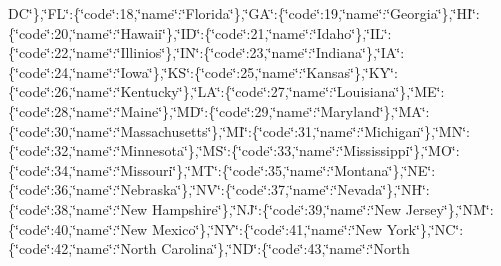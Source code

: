 {D\-C\char`\"{}\},\char`\"{}F\-L\char`\"{}\-:\{\char`\"{}code\char`\"{}\-:18,\char`\"{}name\char`\"{}\-:\char`\"{}Florida\char`\"{}\},\char`\"{}G\-A\char`\"{}\-:\{\char`\"{}code\char`\"{}\-:19,\char`\"{}name\char`\"{}\-:\char`\"{}Georgia\char`\"{}\},\char`\"{}H\-I\char`\"{}\-:\{\char`\"{}code\char`\"{}\-:20,\char`\"{}name\char`\"{}\-:\char`\"{}Hawaii\char`\"{}\},\char`\"{}I\-D\char`\"{}\-:\{\char`\"{}code\char`\"{}\-:21,\char`\"{}name\char`\"{}\-:\char`\"{}Idaho\char`\"{}\},\char`\"{}I\-L\char`\"{}\-:\{\char`\"{}code\char`\"{}\-:22,\char`\"{}name\char`\"{}\-:\char`\"{}Illinios\char`\"{}\},\char`\"{}I\-N\char`\"{}\-:\{\char`\"{}code\char`\"{}\-:23,\char`\"{}name\char`\"{}\-:\char`\"{}Indiana\char`\"{}\},\char`\"{}I\-A\char`\"{}\-:\{\char`\"{}code\char`\"{}\-:24,\char`\"{}name\char`\"{}\-:\char`\"{}Iowa\char`\"{}\},\char`\"{}K\-S\char`\"{}\-:\{\char`\"{}code\char`\"{}\-:25,\char`\"{}name\char`\"{}\-:\char`\"{}Kansas\char`\"{}\},\char`\"{}K\-Y\char`\"{}\-:\{\char`\"{}code\char`\"{}\-:26,\char`\"{}name\char`\"{}\-:\char`\"{}Kentucky\char`\"{}\},\char`\"{}L\-A\char`\"{}\-:\{\char`\"{}code\char`\"{}\-:27,\char`\"{}name\char`\"{}\-:\char`\"{}Louisiana\char`\"{}\},\char`\"{}M\-E\char`\"{}\-:\{\char`\"{}code\char`\"{}\-:28,\char`\"{}name\char`\"{}\-:\char`\"{}Maine\char`\"{}\},\char`\"{}M\-D\char`\"{}\-:\{\char`\"{}code\char`\"{}\-:29,\char`\"{}name\char`\"{}\-:\char`\"{}Maryland\char`\"{}\},\char`\"{}M\-A\char`\"{}\-:\{\char`\"{}code\char`\"{}\-:30,\char`\"{}name\char`\"{}\-:\char`\"{}Massachusetts\char`\"{}\},\char`\"{}M\-I\char`\"{}\-:\{\char`\"{}code\char`\"{}\-:31,\char`\"{}name\char`\"{}\-:\char`\"{}Michigan\char`\"{}\},\char`\"{}M\-N\char`\"{}\-:\{\char`\"{}code\char`\"{}\-:32,\char`\"{}name\char`\"{}\-:\char`\"{}Minnesota\char`\"{}\},\char`\"{}M\-S\char`\"{}\-:\{\char`\"{}code\char`\"{}\-:33,\char`\"{}name\char`\"{}\-:\char`\"{}Mississippi\char`\"{}\},\char`\"{}M\-O\char`\"{}\-:\{\char`\"{}code\char`\"{}\-:34,\char`\"{}name\char`\"{}\-:\char`\"{}Missouri\char`\"{}\},\char`\"{}M\-T\char`\"{}\-:\{\char`\"{}code\char`\"{}\-:35,\char`\"{}name\char`\"{}\-:\char`\"{}Montana\char`\"{}\},\char`\"{}N\-E\char`\"{}\-:\{\char`\"{}code\char`\"{}\-:36,\char`\"{}name\char`\"{}\-:\char`\"{}Nebraska\char`\"{}\},\char`\"{}N\-V\char`\"{}\-:\{\char`\"{}code\char`\"{}\-:37,\char`\"{}name\char`\"{}\-:\char`\"{}Nevada\char`\"{}\},\char`\"{}N\-H\char`\"{}\-:\{\char`\"{}code\char`\"{}\-:38,\char`\"{}name\char`\"{}\-:\char`\"{}New Hampshire\char`\"{}\},\char`\"{}N\-J\char`\"{}\-:\{\char`\"{}code\char`\"{}\-:39,\char`\"{}name\char`\"{}\-:\char`\"{}New Jersey\char`\"{}\},\char`\"{}N\-M\char`\"{}\-:\{\char`\"{}code\char`\"{}\-:40,\char`\"{}name\char`\"{}\-:\char`\"{}New Mexico\char`\"{}\},\char`\"{}N\-Y\char`\"{}\-:\{\char`\"{}code\char`\"{}\-:41,\char`\"{}name\char`\"{}\-:\char`\"{}New York\char`\"{}\},\char`\"{}N\-C\char`\"{}\-:\{\char`\"{}code\char`\"{}\-:42,\char`\"{}name\char`\"{}\-:\char`\"{}North Carolina\char`\"{}\},\char`\"{}N\-D\char`\"{}\-:\{\char`\"{}code\char`\"{}\-:43,\char`\"{}name\char`\"{}\-:\char`\"{}North }
